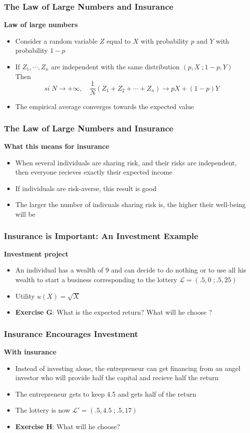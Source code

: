 \documentclass[handout]{beamer}
\newenvironment{iPar}[1]{\textbf{#1} \begin{itemize}}{\end{itemize}}
\newcommand{\mc}{\mathcal}
\begin{document}
\begin{frame} \frametitle{The Law of Large Numbers and Insurance}

\begin{iPar}{Law of large numbers} \item Consider a random variable $Z$
equal to $X$ with probability $p$ and $Y$ with probability $1-p$ \item If $Z_1,
\cdots , Z_n$ are independent with the same distribution $(p,X \;; 1-p,Y)$
Then $$si\; N \to +\infty,\quad  \frac{1}{N} (Z_1 + Z_2 + \cdots + Z_n)
\to pX + (1-p)Y$$

\item The empirical average converges towards the expected value \end{iPar}
\end{frame}


\begin{frame} \frametitle{The Law of Large Numbers and Insurance}

\begin{iPar}{What this means for insurance} \item When several individuals are sharing risk, and their risks are independent, then everyone recieves exactly their expected income \item If individuals are risk-averse, this result is good \item The larger the number of indivuals sharing risk is, the higher their well-being will be  \end{iPar}

\end{frame}

\begin{frame}\frametitle{Insurance is Important: An Investment Example}
\textbf{Investment project}\begin{itemize} \item An individual has a wealth of 9 and can decide to do nothing or to use all his wealth to start a business corresponding to the lottery $\mc L = (.5,0 \;; .5,25)$ \item Utility $u(X) = \sqrt{X}$ \item \textbf{Exercise G}: What is the expected return? What will he choose ? \end{itemize}\end{frame}

\begin{frame}\frametitle{Insurance Encourages Investment}

\begin{iPar}{With insurance} \item Instead of investing alone, the entrepreneur can get financing from an angel investor who will provide half the capital and recieve half the return \item The entrepreneur gets to keep 4.5 and gets half of the return \item The lottery is now $\mc L' = (.5,4.5 \;; .5,17)$ \item \textbf{Exercise H}: What will he choose?\end{iPar}

 \end{frame}
\end{document}

